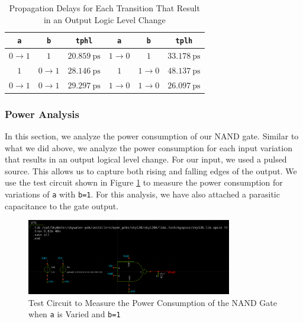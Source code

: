 \documentclass[fleqn]{article}
\begin{document}
	\begin{table}[H]
	\begin{center}
	\caption{Propagation Delays for Each Transition That Result in an Output Logic Level Change}
	\label{table::nand_gate_delay_analysis}
	\begin{tabular}{| c | c | c || c | c | c |}
		\hline
		\texttt{a} & \texttt{b} & \texttt{tphl} & \texttt{a} & \texttt{b} & \texttt{tplh} \\
		\hline	
		$0 \rightarrow 1$ & $1$ & $20.859\ \text{ps}$ & $1 \rightarrow 0$ & $1$ & $33.178\ \text{ps}$\\
		\hline	
		$1$ & $0 \rightarrow 1$ & $28.146\ \text{ps}$ & $1$ & $1 \rightarrow 0$ & $48.137\ \text{ps}$\\
		\hline	
		$0 \rightarrow 1$ & $0 \rightarrow 1$ & $29.297\ \text{ps}$ & $1 \rightarrow 0$ & $1 \rightarrow 0$ & $26.097\ \text{ps}$\\
		\hline
	\end{tabular}
	\end{center}
	\end{table}
	
	\subsubsection{Power Analysis}
	
	In this section, we analyze the power consumption of our NAND gate. Similar to what we did above, we analyze the power consumption for each input variation that results in an output logical level change. For our input, we used a pulsed source. This allows us to capture both rising and falling edges of the output. We use the test circuit shown in Figure \ref{fig::nand_power_test_sweep_va} to measure the power consumption for variations of \texttt{a} with \texttt{b=1}. For this analysis, we have also attached a parasitic capacitance to the gate output.
	
	\begin{figure}[H]
		\centerline{\includegraphics[width=0.8\textwidth]{nand_power_test_sweep_va.png}}
		\caption{Test Circuit to Measure the Power Consumption of the NAND Gate when \texttt{a} is Varied and \texttt{b=1}}
		\label{fig::nand_power_test_sweep_va}
	\end{figure}
	
\end{document}
